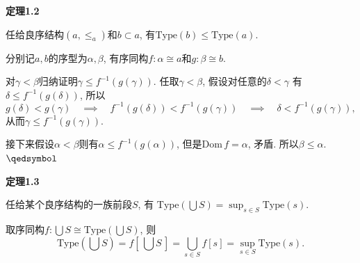 \hypertarget{sec:定理1.2}{}
\noindent\textbf{定理1.2}

任给良序结构$(a,\leqslant_a)$和$b\subset a$,
有$\mathrm{Type}(b)\leqslant\mathrm{Type}(a)$.


分别记$a,b$的序型为$\alpha,\beta$, 有序同构$f:\alpha\cong a$和$g:\beta\cong b$.

对$\gamma<\beta$归纳证明$\gamma\leqslant f^{-1}(g(\gamma))$.
任取$\gamma<\beta$, 假设对任意的$\delta<\gamma$
有$\delta\leqslant f^{-1}(g(\delta))$, 所以
\[
    g(\delta)<g(\gamma)\quad\implies\quad f^{-1}(g(\delta))<f^{-1}(g(\gamma))
    \quad\implies\quad \delta<f^{-1}(g(\gamma)),
\]
从而$\gamma\leqslant f^{-1}(g(\gamma))$.

接下来假设$\alpha<\beta$则有$\alpha\leqslant f^{-1}(g(\alpha))$,
但是$\mathrm{Dom}\,f=\alpha$, 矛盾. 所以$\beta\leqslant\alpha$. \hfill $\qedsymbol$

\vspace{10pt}

\hypertarget{sec:定理1.3}{}
\noindent\textbf{定理1.3}

任给某个良序结构的一族前段$S$, 有
$\displaystyle\mathrm{Type}\left(\bigcup S\right)=\sup_{s\in S}\mathrm{Type}(s)$.


取序同构$\displaystyle f:\bigcup S\cong\mathrm{Type}\left(\bigcup S\right)$, 则
\begin{equation*}
    \mathrm{Type}\left(\bigcup S\right)=f\left[\,\bigcup S\,\right]=
    \bigcup_{s\in S}f[s]=\sup_{s\in S}\mathrm{Type}(s).
\tag*{\qedsymbol}\end{equation*}

